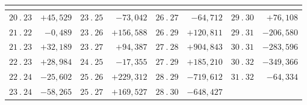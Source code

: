 \par\medskip
{\centering
\setlength{\tabcolsep}{.24em}
\begin{tabular}{|c|r||c|r||c|r||c|r|}
&&
&&
&&
&\\[2pt]
\hline
\(20\ .\ 23\) & \(+45{,}529\) & \(23\ .\ 25\) & \(-73{,}042\) & \(26\ .\ 27\) & \(-64{,}712\) & \(29\ .\ 30\) & \(+76{,}108\)\\
\(21\ .\ 22\) & \(-0{,}489\) & \(23\ .\ 26\) & \(+156{,}588\) & \(26\ .\ 29\) & \(+120{,}811\) & \(29\ .\ 31\) & \(-206{,}580\)\\
\(21\ .\ 23\) & \(+32{,}189\) & \(23\ .\ 27\) & \(+94{,}387\) & \(27\ .\ 28\) & \(+904{,}843\) & \(30\ .\ 31\) & \(-283{,}596\)\\
\(22\ .\ 23\) & \(+28{,}984\) & \(24\ .\ 25\) & \(-17{,}355\) & \(27\ .\ 29\) & \(+185{,}210\) & \(30\ .\ 32\) & \(-349{,}366\)\\
\(22\ .\ 24\) & \(-25{,}602\) & \(25\ .\ 26\) & \(+229{,}312\) & \(28\ .\ 29\) & \(-719{,}612\) & \(31\ .\ 32\) & \(-64{,}334\)\\
\(23\ .\ 24\) & \(-58{,}265\) & \(25\ .\ 27\) & \(+169{,}527\) & \(28\ .\ 30\) & \(-648{,}427\) &  & \\
\end{tabular}\par}
